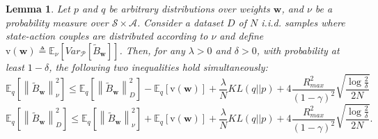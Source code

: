 \documentclass{article}
\newtheorem{lemma}{Lemma}
\newcommand{\wt}[1]{\widetilde{#1}}
\newcommand{\norm}[1]{\left\lVert #1 \right\rVert}
\begin{document}
\begin{lemma}\label{lemma:l2}
Let $p$ and $q$ be arbitrary distributions over weights $\bm{w}$, and $\nu$ be a probability measure over $\mathcal{S}\times\mathcal{A}$. Consider a dataset $D$ of $N$ i.i.d. samples where state-action couples are distributed according to $\nu$ and define $\text{v}(\bm{w}) \triangleq \mathbb{E}_{\nu}\left[Var_{\mathcal{P}}\left[\wt B_{\bm{w}}\right]\right]$. Then, for any $\lambda > 0$ and $\delta > 0$, with probability at least $1-\delta$, the following two inequalities hold simultaneously:
\begin{equation}\label{eq:lemma2-1}
\mathbb{E}_q\left[ \norm{\wt B_{\bm{w}}}_{\nu}^2 \right ] \leq \mathbb{E}_q\left[ \norm{\wt B_{\bm{w}}}_D^2 \right] - \mathbb{E}_q\left[ \text{v}(\bm{w}) \right] + \frac{\lambda}{N} KL(q||p) + 4\frac{R_{max}^2}{(1-\gamma)^2}\sqrt{\frac{\log\frac{2}{\delta}}{2N}}
\end{equation}
\begin{equation}\label{eq:lemma2-2}
\mathbb{E}_q\left[ \norm{\wt B_{\bm{w}}}_D^2 \right] \leq \mathbb{E}_q\left[ \norm{\wt B_{\bm{w}}}_{\nu}^2 \right ] + \mathbb{E}_q\left[ \text{v}(\bm{w}) \right] + \frac{\lambda}{N} KL(q||p) + 4\frac{R_{max}^2}{(1-\gamma)^2}\sqrt{\frac{\log\frac{2}{\delta}}{2N}}.
\end{equation}
\end{lemma}
\end{document}

